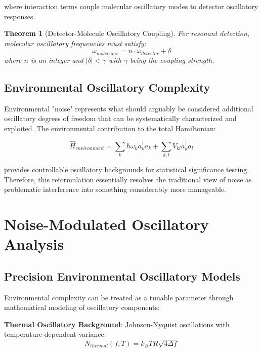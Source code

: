 \documentclass[11pt,a4paper]{article}
\newtheorem{theorem}{Theorem}
\begin{document}
where interaction terms couple molecular oscillatory modes to detector oscillatory responses.

\begin{theorem}[Detector-Molecule Oscillatory Coupling]
For resonant detection, molecular oscillatory frequencies must satisfy:
\begin{equation}
\omega_{molecular} = n \cdot \omega_{detector} + \delta
\end{equation}
where $n$ is an integer and $|\delta| < \gamma$ with $\gamma$ being the coupling strength.
\end{theorem}

\subsection{Environmental Oscillatory Complexity}

Environmental "noise" represents what should arguably be considered additional oscillatory degrees of freedom that can be systematically characterized and exploited. The environmental contribution to the total Hamiltonian:

\begin{equation}
\hat{H}_{environment} = \sum_k \hbar\omega_k a_k^\dagger a_k + \sum_{k,l} V_{kl} a_k^\dagger a_l
\end{equation}

provides controllable oscillatory backgrounds for statistical significance testing. Therefore, this reformulation essentially resolves the traditional view of noise as problematic interference into something considerably more manageable.

\section{Noise-Modulated Oscillatory Analysis}

\subsection{Precision Environmental Oscillatory Models}

Environmental complexity can be treated as a tunable parameter through mathematical modeling of oscillatory components:

\textbf{Thermal Oscillatory Background}: Johnson-Nyquist oscillations with temperature-dependent variance:
\begin{equation}
N_{thermal}(f,T) = k_B T R \sqrt{4\Delta f}
\end{equation}
\end{document}
